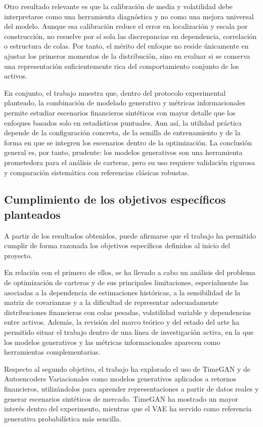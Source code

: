 \documentclass[11pt,a4paper,spanish,oneside]{book}
\numberwithin{equation}{chapter}
\numberwithin{figure}{chapter}
\begin{document}
Otro resultado relevante es que la calibración de media y volatilidad debe interpretarse como una herramienta diagnóstica y no como una mejora universal del modelo. Aunque esa calibración reduce el error en localización y escala por construcción, no resuelve por sí sola las discrepancias en dependencia, correlación o estructura de colas. Por tanto, el mérito del enfoque no reside únicamente en ajustar los primeros momentos de la distribución, sino en evaluar si se conserva una representación suficientemente rica del comportamiento conjunto de los activos.

En conjunto, el trabajo muestra que, dentro del protocolo experimental planteado, la combinación de modelado generativo y métricas informacionales permite estudiar escenarios financieros sintéticos con mayor detalle que los enfoques basados solo en estadísticos puntuales. Aun así, la utilidad práctica depende de la configuración concreta, de la semilla de entrenamiento y de la forma en que se integren los escenarios dentro de la optimización. La conclusión general es, por tanto, prudente: los modelos generativos son una herramienta prometedora para el análisis de carteras, pero su uso requiere validación rigurosa y comparación sistemática con referencias clásicas robustas.

\subsection{Cumplimiento de los objetivos específicos planteados}

A partir de los resultados obtenidos, puede afirmarse que el trabajo ha permitido cumplir de forma razonada los objetivos específicos definidos al inicio del proyecto. 

En relación con el primero de ellos, se ha llevado a cabo un análisis del problema de optimización de carteras y de sus principales limitaciones, especialmente las asociadas a la dependencia de estimaciones históricas, a la sensibilidad de la matriz de covarianzas y a la dificultad de representar adecuadamente distribuciones financieras con colas pesadas, volatilidad variable y dependencias entre activos. Además, la revisión del marco teórico y del estado del arte ha permitido situar el trabajo dentro de una línea de investigación activa, en la que los modelos generativos y las métricas informacionales aparecen como herramientas complementarias.

Respecto al segundo objetivo, el trabajo ha explorado el uso de TimeGAN y de Autoencoders Variacionales como modelos generativos aplicados a retornos financieros, utilizándolos para aprender representaciones a partir de datos reales y generar escenarios sintéticos de mercado. TimeGAN ha mostrado un mayor interés dentro del experimento, mientras que el VAE ha servido como referencia generativa probabilística más sencilla.
\end{document}
